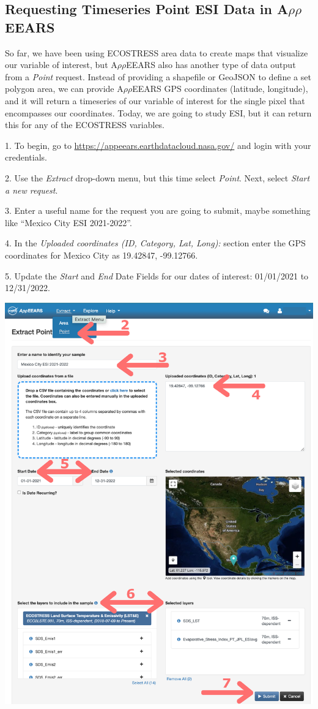 \documentclass[oneside,a4paper,11pt,explicit]{book}
\begin{document}
\subsection{Requesting Timeseries Point ESI Data in A$\rho\rho$EEARS}

So far, we have been using ECOSTRESS area data to create maps that visualize our variable of interest, but A$\rho\rho$EEARS also has another type of data output from a \textit{Point} request. Instead of providing a shapefile or GeoJSON to define a set polygon area, we can provide A$\rho\rho$EEARS GPS coordinates (latitude, longitude), and it will return a timeseries of our variable of interest for the single pixel that encompasses our coordinates. Today, we are going to study ESI, but it can return this for any of the ECOSTRESS variables. 

1. To begin, go to \href{https://appeears.earthdatacloud.nasa.gov/}{https://appeears.earthdatacloud.nasa.gov/} and login with your credentials. 

2. Use the \textit{Extract} drop-down menu, but this time select \textit{Point}. Next, select \textit{Start a new request}. 

3. Enter a useful name for the request you are going to submit, maybe something like ``Mexico City ESI 2021-2022''. 

4. In the \textit{Uploaded coordinates (ID, Category, Lat, Long):} section enter the GPS coordinates for Mexico City as 19.42847, -99.12766.

5. Update the \textit{Start} and \textit{End} Date Fields for our dates of interest: 01/01/2021 to 12/31/2022.

\centerline{\includegraphics[width=.6\textwidth]{ESIpointRequest.png}}
\end{document}
